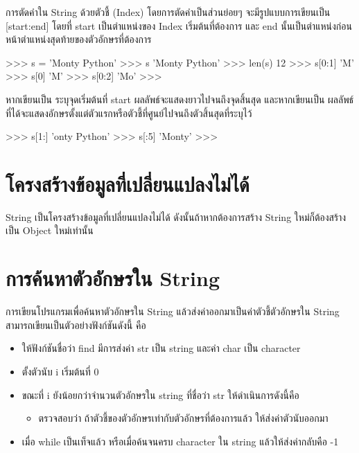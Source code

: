 การตัดคำใน String ด้วยตัวชี้ (Index) โดยการตัดคำเป็นส่วนย่อยๆ จะมีรูปแบบการเขียนเป็น [start:end] โดยที่ start เป็นตำแหน่งของ Index เริ่มต้นที่ต้องการ และ end นั้นเป็นตำแหน่งก่อนหน้าตำแหน่งสุดท้ายของตัวอักษรที่ต้องการ

\begin{pycode}
>>> s = 'Monty Python'
>>> s
'Monty Python'
>>> len(s)
12
>>> s[0:1]
'M'
>>> s[0]
'M'
>>> s[0:2]
'Mo'
>>>
\end{pycode}


หากเขียนเป็น  \pyinline{[start:]} ระบุจุดเริ่มต้นที่ start ผลลัพธ์จะแสดงยาวไปจนถึงจุดสิ้นสุด และหากเขียนเป็น  \pyinline{[:end]} ผลลัพธ์ที่ได้จะแสดงอักษรตั้งแต่ตัวแรกหรือตัวชี้ที่ศูนย์ไปจนถึงตัวสิ้นสุดที่ระบุไว้

\begin{pycode}
>>> s[1:]
'onty Python'
>>> s[:5]
'Monty'
>>>
\end{pycode}


\section{โครงสร้างข้อมูลที่เปลี่ยนแปลงไม่ได้}

String เป็นโครงสร้างข้อมูลที่เปลี่ยนแปลงไม่ได้ ดังนั้นถ้าหากต้องการสร้าง String ใหม่ก็ต้องสร้างเป็น Object ใหม่เท่านั้น



\section{การค้นหาตัวอักษรใน String}

การเขียนโปรแกรมเพื่อค้นหาตัวอักษรใน String แล้วส่งค่าออกมาเป็นค่าตัวชี้ตัวอักษรใน String สามารถเขียนเป็นตัวอย่างฟังก์ชันดังนี้ คือ 

\begin{itemize}
\item ให้ฟังก์ชันชื่อว่า find มีการส่งค่า str เป็น string และค่า char เป็น character 
\item ตั้งตัวนับ i เริ่มต้นที่ 0
\item ขณะที่ i ยังน้อยกว่าจำนวนตัวอักษรใน string ที่ชื่อว่า str ให้ดำเนินการดังนี้คือ
	\begin{itemize}
		\item ตรวจสอบว่า ถ้าตัวชี้ของตัวอักษรเท่ากับตัวอักษรที่ต้องการแล้ว ให้ส่งค่าตัวนับออกมา
	\end{itemize}
\item เมื่อ while เป็นเท็จแล้ว หรือเมื่อค้นจนครบ character ใน string แล้วให้ส่งค่ากลับคือ -1
\end{itemize}


